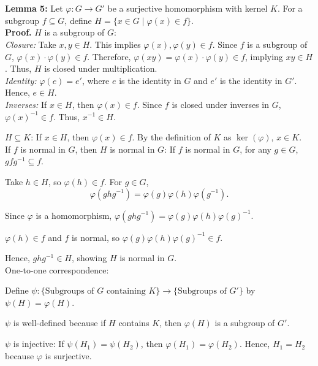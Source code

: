 \\
\\
\textbf{Lemma 5:}
Let \( \varphi: G \to G' \) be a surjective homomorphism with kernel \( K \). For a subgroup \( f \subseteq G \), define \( H = \{ x \in G \mid \varphi(x) \in f \} \).
\\
\textbf{Proof.}
{\( H \) is a subgroup of \( G \):}
   \\
   \textit{Closure:} Take \( x, y \in H \). This implies \( \varphi(x), \varphi(y) \in f \). Since \( f \) is a subgroup of \( G \), \( \varphi(x) \cdot \varphi(y) \in f \). Therefore, \( \varphi(xy) = \varphi(x) \cdot \varphi(y) \in f \), implying \( xy \in H \). Thus, \( H \) is closed under multiplication.
   \\
   \textit{Identity:} \( \varphi(e) = e' \), where \( e \) is the identity in \( G \) and \( e' \) is the identity in \( G' \). Hence, \( e \in H \).
   \\
   \textit{Inverses:} If \( x \in H \), then \( \varphi(x) \in f \). Since \( f \) is closed under inverses in \( G \), \( \varphi(x)^{-1} \in f \). Thus, \( x^{-1} \in H \).


\( H \subseteq K \):
   If \( x \in H \), then \( \varphi(x) \in f \). By the definition of \( K \) as \( \ker(\varphi) \), \( x \in K \).\\
{If \( f \) is normal in \( G \), then \( H \) is normal in \( G \):}
   If \( f \) is normal in \( G \), for any \( g \in G \), \( gfg^{-1} \subseteq f \).
   
   Take \( h \in H \), so \( \varphi(h) \in f \). For \( g \in G \),
     \[
     \varphi(ghg^{-1}) = \varphi(g) \varphi(h) \varphi(g^{-1}).
     \]
   
   Since \( \varphi \) is a homomorphism, \( \varphi(ghg^{-1}) = \varphi(g) \varphi(h) \varphi(g)^{-1} \).
   
   \( \varphi(h) \in f \) and \( f \) is normal, so \( \varphi(g) \varphi(h) \varphi(g)^{-1} \in f \).

   Hence, \( ghg^{-1} \in H \), showing \( H \) is normal in \( G \).\\
{One-to-one correspondence:}

   Define \( \psi: \{ \text{Subgroups of } G \text{ containing } K \} \to \{ \text{Subgroups of } G' \} \) by \( \psi(H) = \varphi(H) \).
   
   \( \psi \) is well-defined because if \( H \) contains \( K \), then \( \varphi(H) \) is a subgroup of \( G' \).
   
   \( \psi \) is injective: If \( \psi(H_1) = \psi(H_2) \), then \( \varphi(H_1) = \varphi(H_2) \). Hence, \( H_1 = H_2 \) because \( \varphi \) is surjective.
   
